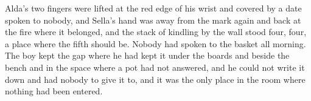 Alda's two fingers were lifted at the red edge of his wrist and covered by a date spoken to nobody, and Sella's hand was away from the mark again and back at the fire where it belonged, and the stack of kindling by the wall stood four, four, a place where the fifth should be. Nobody had spoken to the basket all morning. The boy kept the gap where he had kept it under the boards and beside the bench and in the space where a pot had not answered, and he could not write it down and had nobody to give it to, and it was the only place in the room where nothing had been entered.
